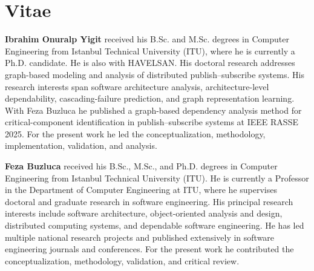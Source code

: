%
%

\section*{Vitae}

\noindent\textbf{Ibrahim Onuralp Yigit} received his B.Sc. and M.Sc. degrees in Computer Engineering from Istanbul Technical University (ITU), where he is currently a Ph.D. candidate. He is also with HAVELSAN. His doctoral research addresses graph-based modeling and analysis of distributed publish--subscribe systems. His research interests span software architecture analysis, architecture-level dependability, cascading-failure prediction, and graph representation learning. With Feza Buzluca he published a graph-based dependency analysis method for critical-component identification in publish--subscribe systems at IEEE RASSE 2025. For the present work he led the conceptualization, methodology, implementation, validation, and analysis.

\bigskip

\noindent\textbf{Feza Buzluca} received his B.Sc., M.Sc., and Ph.D. degrees in Computer Engineering from Istanbul Technical University (ITU). He is currently a Professor in the Department of Computer Engineering at ITU, where he supervises doctoral and graduate research in software engineering. His principal research interests include software architecture, object-oriented analysis and design, distributed computing systems, and dependable software engineering. He has led multiple national research projects and published extensively in software engineering journals and conferences. For the present work he contributed the conceptualization, methodology, validation, and critical review.
